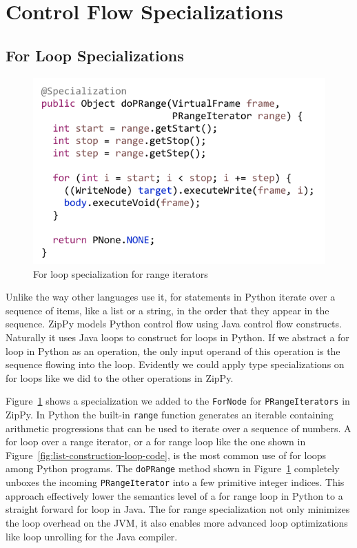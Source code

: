 \section{Control Flow Specializations}

\subsection{For Loop Specializations}

\begin{figure}
\centering
\includegraphics[scale=.9]{figures/ch3-for-range-node-code.pdf}
\caption{For loop specialization for range iterators}
\label{fig:for-range-node}
\end{figure}

Unlike the way other languages use it, for statements in Python iterate over a sequence of items, like a list or a string, in the order that they appear in the sequence.
ZipPy models Python control flow using Java control flow constructs.
Naturally it uses Java loops to construct for loops in Python.
If we abstract a for loop in Python as an operation, the only input operand of this operation is the sequence flowing into the loop.
Evidently we could apply type specializations on for loops like we did to the other operations in ZipPy.

Figure~\ref{fig:for-range-node} shows a specialization we added to the \texttt{ForNode} for \texttt{PRangeIterators} in ZipPy.
In Python the built-in \texttt{range} function generates an iterable containing arithmetic progressions that can be used to iterate over a sequence of numbers.
A for loop over a range iterator, or a for range loop like the one shown in Figure~\ref{fig:list-construction-loop-code}, is the most common use of for loops among Python programs.
The \texttt{doPRange} method shown in Figure~\ref{fig:for-range-node} completely unboxes the incoming \texttt{PRangeIterator} into a few primitive integer indices.
This approach effectively lower the semantics level of a for range loop in Python to a straight forward for loop in Java.
The for range specialization not only minimizes the loop overhead on the JVM, it also enables more advanced loop optimizations like loop unrolling for the Java compiler.

